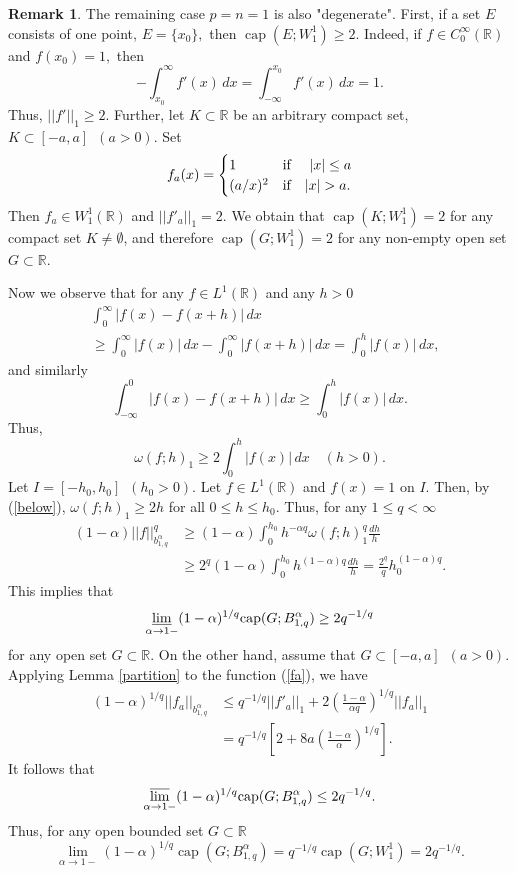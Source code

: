 \documentclass[12pt,twoside,reqno]{amsart}
\numberwithin{equation}{section}
\theoremstyle{definition}
\newtheorem{rem}[teo]{Remark}
\numberwithin{equation}{section}
\begin{document}
\begin{rem} The remaining case $p=n=1$ is also "degenerate". First, if a
set $E$ consists of one point, $E=\{x_0\},$ then ${\operatorname{cap}}(E;W_1^1)\ge
2.$ Indeed, if $f\in C_0^\infty({\mathbb{R}})$ and $f(x_0)=1,$ then
$$
-\int_{x_0}^\infty f'(x)\,dx=\int_{-\infty}^{x_0} f'(x)\,dx=1.
$$
Thus, $||f'||_1\ge 2.$ Further, let $K\subset {\mathbb{R}}$ be an arbitrary
compact set, $K\subset [-a,a]\,\,\,(a>0).$ Set
\begin{equation}\label{fa}
f_a(x)=\begin{cases}
    1 &\textnormal{if }\quad |x|\le a \\
    (a/x)^2 &\textnormal{if}\quad |x|>a.
  \end{cases}
\end{equation}
Then $f_a\in W_1^1({\mathbb{R}})$ and $||f'_a||_1=2.$ We obtain that
${\operatorname{cap}}(K;W_1^1)=2$ for any  compact set $K\not=\emptyset$, and therefore
${\operatorname{cap}}(G;W_1^1)=2$ for any non-empty open set $G\subset {\mathbb{R}}$.

Now we observe that for any $f\in L^1({\mathbb{R}})$
 and any $h>0$
 $$
 \begin{aligned}
 &\int_0^\infty |f(x)-f(x+h)|\,dx\\
 &\ge \int_0^\infty |f(x)|\,dx - \int_0^\infty |f(x+h)|\,dx=\int_0^h |f(x)|\,dx,
 \end{aligned}
 $$
 and similarly
$$
\int_{-\infty}^0 |f(x)-f(x+h)|\,dx\ge \int_0^h |f(x)|\,dx.
$$
Thus,
\begin{equation}\label{below}
{\omega}(f;h)_1\ge 2 \int_0^h |f(x)|\,dx \quad (h>0).
\end{equation}
Let $I=[-h_0,h_0]\,\,\,(h_0>0).$ Let  $f\in L^1({\mathbb{R}})$ and $f(x)=1$ on
$I$. Then, by (\ref{below}), ${\omega}(f;h)_1\ge 2h$ for all $0\le h\le
h_0.$ Thus, for any $1\le q<\infty$
$$
\begin{aligned}
(1-{\alpha})||f||_{b_{1,q}^{\alpha}}^q&\ge (1-{\alpha}) \int_0^{h_0}h^{-{\alpha} q}{\omega}(f;h)_1^q\frac{dh}{h}\\
&\ge 2^q(1-{\alpha})\int_0^{h_0}h^{(1-{\alpha}) q}\frac{dh}{h} = \frac{2^q}{q}h_0^{(1-{\alpha}) q}.
\end{aligned}
$$
This implies that
$$
\varliminf_{{\alpha}\to 1-}(1-{\alpha})^{1/q}{\operatorname{cap}}(G; B_{1,q}^{\alpha})\ge 2q^{-1/q}
$$
for any  open set $G\subset {\mathbb{R}}$. On the other hand, assume that $G\subset
[-a,a]\,\,\,(a>0)$. Applying Lemma \ref{partition} to the
function (\ref{fa}), we have
$$
\begin{aligned}
(1-{\alpha})^{1/q}||f_a||_{b_{1,q}^{\alpha}}&\le q^{-1/q}||f'_a||_1+2\left(\frac{1-{\alpha}}{{\alpha} q}\right)^{1/q}||f_a||_1\\
&=q^{-1/q} \left[2+8a\left(\frac{1-{\alpha}}{\alpha}\right)^{1/q}\right].
\end{aligned}
$$
It follows that
$$
\varlimsup_{{\alpha}\to 1-}(1-{\alpha})^{1/q}{\operatorname{cap}}(G; B_{1,q}^{\alpha})\le 2q^{-1/q}.
$$
Thus, for any open bounded set $G\subset {\mathbb{R}}$
$$
\lim_{{\alpha}\to 1-}(1-{\alpha})^{1/q}{\operatorname{cap}}(G; B_{1,q}^{\alpha})=q^{-1/q}{\operatorname{cap}} (G; W_1^1)= 2q^{-1/q}.
$$
\end{rem}
\end{document}
